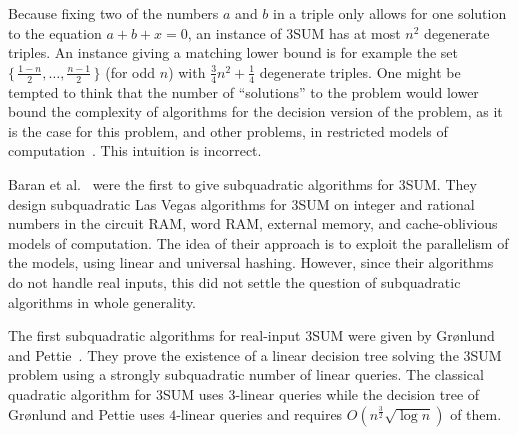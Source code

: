 Because fixing two of the numbers $a$ and $b$ in a triple only allows for one
solution to the equation $a + b + x = 0$, an instance of 3SUM has at most
$n^2$ degenerate triples. An instance giving a matching lower bound is for
example the set $\{\,\frac{1-n}{2},\ldots,\frac{n-1}{2}\,\}$ (for odd $n$)
with $\frac{3}{4} n^2 + \frac 14$ degenerate triples.
%
One might be tempted to think that the number of ``solutions'' to the problem
would lower bound the complexity of algorithms for the decision version of the
problem, as it is the case for this problem, and other problems, in restricted
models of computation~\cite{Er96,Er99a}.
%
This intuition is incorrect.
%

Baran et al.~\cite{BDP08} were the first to give subquadratic algorithms for
3SUM. They design subquadratic Las Vegas
algorithms for 3SUM on integer and
rational numbers in the circuit RAM, word RAM, external memory, and
cache-oblivious models of computation. The idea of their approach is to exploit
the parallelism of the models, using linear and universal hashing. However,
since their algorithms do not handle real inputs,
this did not settle the question of subquadratic algorithms in whole
generality.

The first subquadratic algorithms for real-input 3SUM were given by
Gr{\o}nlund and Pettie~\cite{GP18}. They prove the existence of a linear decision tree
solving the 3SUM problem using a strongly subquadratic number of linear queries.
The classical quadratic algorithm for 3SUM uses \(3\)-linear queries
while the decision tree of Gr{\o}nlund and Pettie uses \(4\)-linear queries and
requires $O(n^{\frac{3}{2}} \sqrt{\log n})$ of them.

